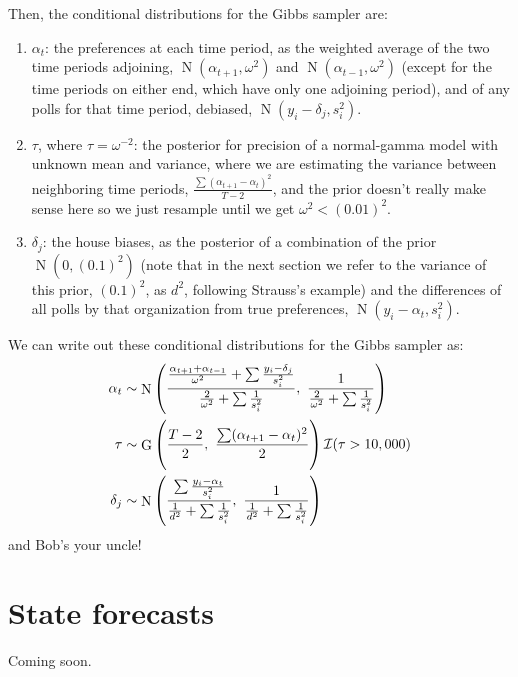 \documentclass[12pt]{article}
\DeclareMathOperator{\G}{G}
\DeclareMathOperator{\N}{N}
\begin{document}
Then, the conditional distributions for the Gibbs sampler are:
\begin{enumerate}
	\item $\alpha_t$: the preferences at each time period, as the weighted average of the two time periods adjoining, $\N(\alpha_{t+1}, \omega^2)$ and $\N(\alpha_{t-1}, \omega^2)$ (except for the time periods on either end, which have only one adjoining period), and of any polls for that time period, debiased, $\N(y_i - \delta_j, s_i^2)$.
	
	\item $\tau$, where $\tau = \omega^{-2}$: the posterior for precision of a normal-gamma model with unknown mean and variance, where we are estimating the variance between neighboring time periods, $\frac{\sum(\alpha_{t+1} - \alpha_t)^2}{T-2}$, and the prior doesn't really make sense here so we just resample until we get $\omega^2 < (0.01)^2$.
	
	\item $\delta_j$: the house biases, as the posterior of a combination of the prior $\N(0, (0.1)^2)$ (note that in the next section we refer to the variance of this prior, $(0.1)^2$, as $d^2$, following Strauss's example) and the differences of all polls by that organization from true preferences, $\N(y_i - \alpha_t, s_i^2)$.
\end{enumerate}
We can write out these conditional distributions for the Gibbs sampler as:
\begin{align*}
\alpha_t &\sim \N\left(\frac{  \frac{\alpha_{t+1} + \alpha_{t-1}}{\omega^2} + \sum\frac{y_i - \delta_j}{s_i^2}}{ \frac{2}{\omega^2} + \sum\frac{1}{s_i^2} }, \text{~} \frac{1}{\frac{2}{\omega^2} + \sum\frac{1}{s_i^2}}\right) \\
\tau &\sim \G\left(
\frac{T-2}{2}
, \text{~}
\frac{\sum(\alpha_{t+1} - \alpha_{t})^2}{2}
\vphantom{\frac{  \frac{\alpha_{t+1} + \alpha_{t-1}}{\omega^2} + \sum\frac{y_i - \delta_j}{s_i^2}}{ \frac{2}{\omega^2} + \sum\frac{1}{s_i^2} }, \text{~} \frac{1}{\frac{2}{\omega^2} + \sum\frac{1}{s_i^2}}}
%
\right) \mathcal{I}(\tau > 10,000) \\
\delta_j &\sim \N\left(\frac{ \sum\frac{y_i - \alpha_t}{s_i^2}}{\frac{1}{d^2} + \sum \frac{1}{s_i^2}}, \text{~} \frac{1}{ \frac{1}{d^2} + \sum \frac{1}{s_i^2}}
\vphantom{\frac{  \frac{\alpha_{t+1} + \alpha_{t-1}}{\omega^2} + \sum\frac{y_i - \delta_j}{s_i^2}}{ \frac{2}{\omega^2} + \sum\frac{1}{s_i^2} }, \text{~} \frac{1}{\frac{2}{\omega^2} + \sum\frac{1}{s_i^2}}}
%
\right)
\end{align*}
and Bob's your uncle!


\section{State forecasts}

Coming soon.
\end{document}

